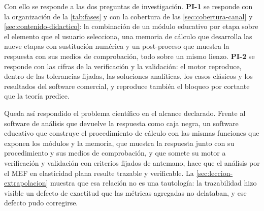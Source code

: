 Con ello se responde a las dos preguntas de investigación. \textbf{PI-1} se responde con la organización de la \autoref{tab:fases} y con la cobertura de las \autoref{sec:cobertura-canal} y \autoref{sec:contenido-didactico}: la combinación de un módulo educativo por etapa sobre el elemento que el usuario selecciona, una memoria de cálculo que desarrolla las nueve etapas con sustitución numérica y un post-proceso que muestra la respuesta con sus medios de comprobación, todo sobre un mismo lienzo. \textbf{PI-2} se responde con las cifras de la verificación y la validación: el motor reproduce, dentro de las tolerancias fijadas, las soluciones analíticas, los casos clásicos y los resultados del software comercial, y reproduce también el bloqueo por cortante que la teoría predice.

Queda así respondido el problema científico en el alcance declarado. Frente al software de análisis que devuelve la respuesta como caja negra, un software educativo que construye el procedimiento de cálculo con las mismas funciones que exponen los módulos y la memoria, que muestra la respuesta junto con su procedimiento y sus medios de comprobación, y que somete su motor a verificación y validación con criterios fijados de antemano, hace que el análisis por el MEF en elasticidad plana resulte trazable y verificable. La \autoref{sec:leccion-extrapolacion} muestra que esa relación no es una tautología: la trazabilidad hizo visible un defecto de exactitud que las métricas agregadas no delataban, y ese defecto pudo corregirse.
